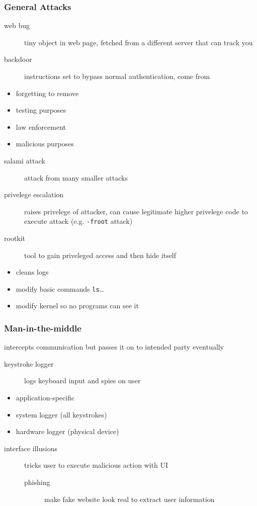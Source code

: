 \documentclass[]{article}
\theoremstyle{definition}
\begin{document}
	\subsubsection{General Attacks}
	\begin{description}
		\item[web bug] tiny object in web page, fetched from a different server that can track you
		\item[backdoor] instructions set to bypass normal authentication, come from
	\end{description}
	\begin{itemize}
		\item forgetting to remove
		\item testing purposes
		\item law enforcement
		\item malicious purposes
	\end{itemize}
	\begin{description}
		\item[salami attack] attack from many smaller attacks
		\item[privelege escalation] raises privelege of attacker, can cause legitimate higher privelege code to execute attack (e.g. \texttt{-froot} attack)
		\item[rootkit] tool to gain priveleged access and then hide itself
	\end{description}
	\begin{itemize}
		\item cleans logs
		\item modify basic commands \lstinline|ls|\dots
		\item modify kernel so no programs can see it
	\end{itemize}

	\subsubsection{Man-in-the-middle}
	intercepts communication but passes it on to intended party eventually
	\begin{description}
		\item[keystroke logger] logs keyboard input and spies on user
	\end{description}
	\begin{itemize}
		\item application-specific
		\item system logger (all keystrokes)
		\item hardware logger (physical device)
	\end{itemize}
	\begin{description}
		\item[interface illusions] tricks user to execute malicious action with UI
			\begin{description}
				\item[phishing] make fake website look real to extract user information
			\end{description}
	\end{description}
\end{document}
